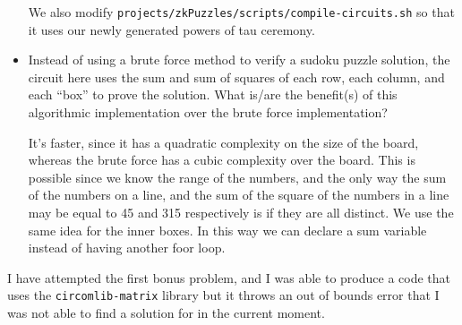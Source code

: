 \documentclass{article}
\begin{document}
\begin{itemize}
\begin{lstlisting}[language=Bash]
    \end{lstlisting}
    We also modify \texttt{projects/zkPuzzles/scripts/compile-circuits.sh} so that it uses our newly generated powers of tau ceremony.
    \item Instead of using a brute force method to verify a sudoku puzzle solution, the circuit here uses the sum and sum of squares of each row, each column, and each “box” to prove the solution. What is/are the benefit(s) of this algorithmic implementation over the brute force implementation? \par It's faster, since it has a quadratic complexity on the size of the board, whereas the brute force has a cubic complexity over the board. This is possible since we know the range of the numbers, and the only way the sum of the numbers on a line, and the sum of the square of the numbers in a line may be equal to 45 and 315 respectively is if they are all distinct. We use the same idea for the inner boxes. In this way we can declare a sum variable instead of having another foor loop.
\end{itemize}

I have attempted the first bonus problem, and I was able to produce a code that uses the \texttt{circomlib-matrix} library but it throws an out of bounds error that I was not able to find a solution for in the current moment.
\end{document}
